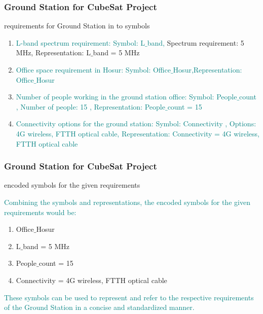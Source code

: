 \newpage
\begin{frame}
\frametitle{Ground Station for CubeSat Project }
\begin{block}{requirements for Ground Station  in to symbols }

\begin{enumerate}
    \item  \textcolor{teal}{ L-band spectrum requirement: Symbol: L$\_$band,}
Spectrum requirement: 5 MHz, Representation: L$\_$band = 5 MHz
    \item \textcolor{teal}{ Office space requirement in Hosur: 
Symbol: Office$\_$Hosur,Representation: Office$\_$Hosur}
    \item \textcolor{teal}{ Number of people working in the ground station office:  Symbol: People$\_$count , Number of people: 15 , Representation: People$\_$count = 15}
    \item  \textcolor{teal}{Connectivity options for the ground station:
 Symbol: Connectivity , 
Options: 4G wireless, FTTH optical cable, 
Representation: Connectivity = {4G wireless, FTTH optical cable}}
\end{enumerate}

 
\end{block}
\end{frame}

\newpage
\begin{frame}
\frametitle{Ground Station for CubeSat Project }
\begin{block}{encoded symbols for the given requirements }

\textcolor{teal}{
Combining the symbols and representations, the encoded symbols for the given requirements would be:}

\begin{enumerate}
    \item Office$\_$Hosur
     \item   L$\_$band = 5 MHz
     \item  People$\_$count = 15
     \item  Connectivity = {4G wireless, FTTH optical cable}
\end{enumerate}

\textcolor{teal}{
These symbols can be used to represent and refer to the respective requirements of the Ground Station in a concise and standardized manner.}

\end{block}
\end{frame}


